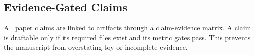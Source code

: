 \subsection{Evidence-Gated Claims}

All paper claims are linked to artifacts through a claim-evidence matrix. A
claim is draftable only if its required files exist and its metric gates pass.
This prevents the manuscript from overstating toy or incomplete evidence.
